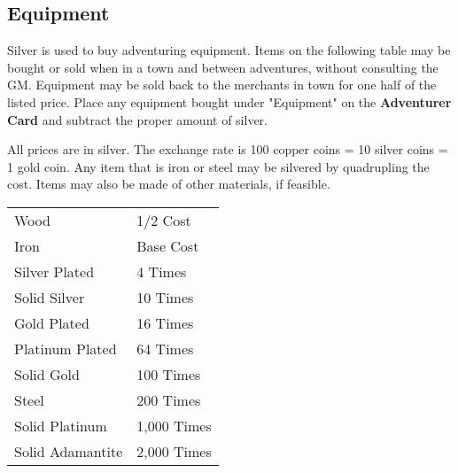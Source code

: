 \begin{multicols*}{2}
\section{Equipment}
Silver is used to buy adventuring equipment. Items on the following table may be bought or sold when in a town and between adventures, without consulting the GM. Equipment may be sold back to the merchants in town for one half of the listed price. Place any equipment bought under "Equipment" on the \textbf{Adventurer Card} and subtract the proper amount of silver.

All prices are in silver. The exchange rate is 100 copper coins = 10 silver coins = 1 gold coin. Any item that is iron or steel may be silvered by quadrupling the cost. Items may also be made of other materials, if feasible.

\begin{tcolorbox}[breakable,boxrule=0pt,title=\textbf{Material cost multiplier chart}]
\begin{tabular}{@{}l l}
Wood  & 1/2 Cost\\
Iron  & Base Cost\\
Silver Plated  & 4 Times\\
Solid Silver  & 10 Times\\
Gold Plated  & 16 Times\\
Platinum Plated  & 64 Times\\
Solid Gold  & 100 Times\\
Steel  & 200 Times\\
Solid Platinum  & 1,000 Times\\
Solid Adamantite  & 2,000 Times\\
\end{tabular}
\end{tcolorbox}
\end{multicols*}
\setlength{\columnsep}{0.05cm}
\begin{multicols*}{3}

\end{multicols*}
\setlength{\columnsep}{\defcolwidth}
